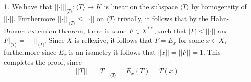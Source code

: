 \documentclass[10.5pt]{article}
\theoremstyle{definition}
\newtheorem{pb}{}
\newcommand{\abs}[1]{\left\vert#1\right\vert}
\newcommand{\norm}[1]{\lvert\lvert#1\rvert\rvert}
\newcommand{\gen}[1]{\langle #1 \rangle}
\begin{document}
        \begin{pb}
            We have that \(\norm{\cdot}\vert_{\gen{T}} : \gen{T} \to K\) is linear on the subspace \(\gen{T}\) by homogeneity of \(\norm{\cdot}\). Furthermore \(\norm{\cdot}\vert_{\gen{T}} \leq \norm{\cdot}\) on \(\gen{T}\) trivially, it follows that by the Hahn-Banach extension theorem, there is some \(F \in X^{**}\), such that \(\abs{F} \leq \norm{\cdot}\) and \(F\vert_{\gen{T}} = \norm{\cdot}\vert_{\gen{T}}\). Since \(X\) is reflexive, it follows that \(F = E_x\) for some \(x \in X\), furthermore since \(E_x\) is an isometry it follows that \(\norm{x} = \norm{F} = 1\). This completes the proof, since
            \begin{align*}
                \norm{T} = \norm{T}\vert_{\gen{T}} = E_x(T) = T(x)
            \end{align*}
        \end{pb}
\end{document}
